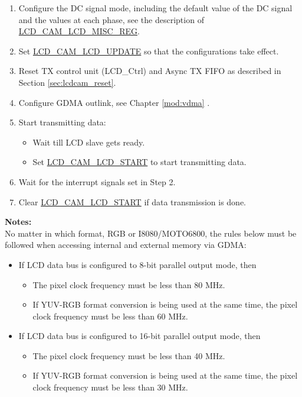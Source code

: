 \documentclass[main\_\_EN.tex]{subfiles}
\begin{document}
\begin{enumerate}
    \item Configure the DC signal mode, including the default value of the DC signal and the values at each phase, see the description of \hyperref[regdesc:LCDCAMLCDMISCREG]{LCD\_CAM\_LCD\_MISC\_REG}.

    \item Set \hyperref[fielddesc:LCDCAMLCDUPDATE]{LCD\_CAM\_LCD\_UPDATE} so that the configurations take effect.

    \item Reset TX control unit (LCD\_Ctrl) and Async TX FIFO as described in Section \ref{sec:lcdcam_reset}.

    \item Configure GDMA outlink, see Chapter \ref{mod:vdma} \textit{}.

    \item Start transmitting data:
    \begin{itemize}
        \item Wait till LCD slave gets ready.
        \item Set \hyperref[fielddesc:LCDCAMLCDSTART]{LCD\_CAM\_LCD\_START} to start transmitting data.
    \end{itemize}

    \item Wait for the interrupt signals set in Step 2.

    \item Clear \hyperref[fielddesc:LCDCAMLCDSTART]{LCD\_CAM\_LCD\_START} if data transmission is done.
\end{enumerate}

\textbf{Notes:}\\
No matter in which format, RGB or I8080/MOTO6800, the rules below must be followed when accessing internal and external memory via GDMA:

\begin{itemize}
    \item If LCD data bus is configured to 8-bit parallel output mode, then
    \begin{itemize}
        \item The pixel clock frequency must be less than 80 MHz.
        \item If YUV-RGB format conversion is being used at the same time, the pixel clock frequency must be less than 60 MHz.
    \end{itemize}
    \item If LCD data bus is configured to 16-bit parallel output mode, then
    \begin{itemize}
        \item The pixel clock frequency must be less than 40 MHz.
        \item If YUV-RGB format conversion is being used at the same time, the pixel clock frequency must be less than 30 MHz.
    \end{itemize}
\end{itemize}
\end{document}
